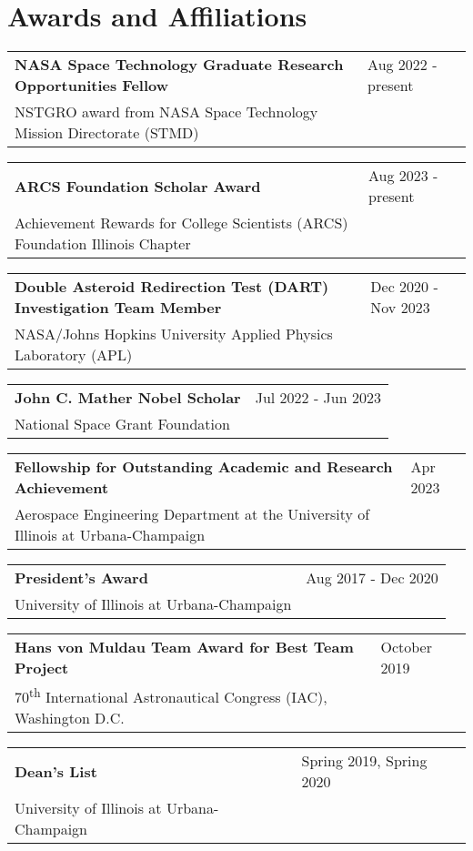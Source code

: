 \documentclass[letterpaper,12pt]{article}
\begin{document}
\section{Awards and Affiliations}
\begin{tabularx}{\linewidth}{@{}l X@{}}
\textbf{NASA Space Technology Graduate Research Opportunities Fellow} & \hfill Aug 2022 - present \\[3.75pt]
NSTGRO award from NASA Space Technology Mission Directorate (STMD) & \hfill \\[3.75pt]
\end{tabularx}
\begin{tabularx}{\linewidth}{@{}l X@{}}
\textbf{ARCS Foundation Scholar Award} & \hfill Aug 2023 - present \\[3.75pt]
Achievement Rewards for College Scientists (ARCS) Foundation Illinois Chapter & \hfill \\[3.75pt]
\end{tabularx}
\begin{tabularx}{\linewidth}{@{}l X@{}}
\textbf{Double Asteroid Redirection Test (DART) Investigation Team Member} & \hfill Dec 2020 - Nov 2023 \\[3.75pt]
NASA/Johns Hopkins University Applied Physics Laboratory (APL) & \hfill \\[3.75pt]
\end{tabularx}
\begin{tabularx}{\linewidth}{@{}l X@{}}
\textbf{John C. Mather Nobel Scholar} & \hfill Jul 2022 - Jun 2023 \\[3.75pt]
National Space Grant Foundation & \hfill \\[3.75pt]
\end{tabularx}
\begin{tabularx}{\linewidth}{@{}l X@{}}
\textbf{Fellowship for Outstanding Academic and Research Achievement} & \hfill Apr 2023 \\[3.75pt]
Aerospace Engineering Department at the University of Illinois at Urbana-Champaign & \hfill \\[3.75pt]
\end{tabularx}
\begin{tabularx}{\linewidth}{@{}l X@{}}
\textbf{President's Award} & \hfill Aug 2017 - Dec 2020 \\[3.75pt]
University of Illinois at Urbana-Champaign & \hfill \\[3.75pt]
\end{tabularx}
\begin{tabularx}{\linewidth}{@{}l X@{}}
\textbf{Hans von Muldau Team Award for Best Team Project} & \hfill October 2019 \\[3.75pt]
70\textsuperscript{th} International Astronautical Congress (IAC), Washington D.C. & \hfill \\[3.75pt]
\end{tabularx}
\begin{tabularx}{\linewidth}{@{}l X@{}}
\textbf{Dean's List} & \hfill Spring 2019, Spring 2020 \\[3.75pt]
University of Illinois at Urbana-Champaign & \hfill \\[3.75pt]
\end{tabularx}
\end{document}
